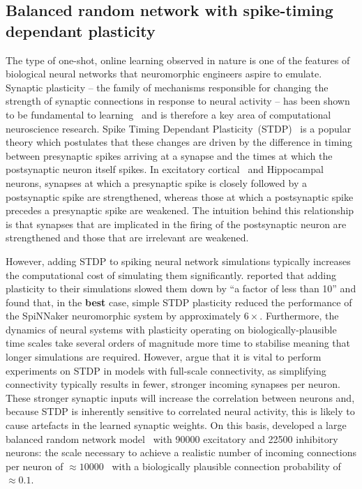 \documentclass[utf8]{frontiersSCNS} %
\begin{document}
\subsection{Balanced random network with spike-timing dependant plasticity}
\label{sec:method/balanced_random}
The type of one-shot, online learning observed in nature is one of the features of biological neural networks that neuromorphic engineers aspire to emulate.
Synaptic plasticity -- the family of mechanisms responsible for changing the strength of synaptic connections in response to neural activity -- has been shown to be fundamental to learning~\citep{Nabavi2014} and is therefore a key area of computational neuroscience research.
Spike Timing Dependant Plasticity~(STDP)~\citep{Markram1997,Bi1998} is a popular theory which postulates that these changes are driven by the difference in timing between presynaptic spikes arriving at a synapse and the times at which the postsynaptic neuron itself spikes.
In excitatory cortical~\citep{Markram1997} and Hippocampal~\citep{Bi1998} neurons, synapses at which a presynaptic spike is closely followed by a postsynaptic spike are strengthened, whereas those at which a postsynaptic spike precedes a presynaptic spike are weakened.
The intuition behind this relationship is that synapses that are implicated in the firing of the postsynaptic neuron are strengthened and those that are irrelevant are weakened.

However, adding STDP to spiking neural network simulations typically increases the computational cost of simulating them significantly. 
\citet{Morrison2007} reported that adding plasticity to their simulations slowed them down by ``a factor of less than 10'' and \citet{Knight2016b} found that, in the \textbf{best} case, simple STDP plasticity reduced the performance of the SpiNNaker neuromorphic system by approximately $6\times$.
Furthermore, the dynamics of neural systems with plasticity operating on biologically-plausible time scales take several orders of magnitude more time to stabilise meaning that longer simulations are required.
However, \citeauthor{Morrison2007} argue that it is vital to perform experiments on STDP in models with full-scale connectivity, as simplifying connectivity typically results in fewer, stronger incoming synapses per neuron.
These stronger synaptic inputs will increase the correlation between neurons and, because STDP is inherently sensitive to correlated neural activity, this is likely to cause artefacts in the learned synaptic weights.
On this basis, \citeauthor{Morrison2007} developed a large balanced random network model~\citep{Brunel2000} with \num{90000} excitatory and \num{22500} inhibitory neurons: the scale necessary to achieve a realistic number of incoming connections per neuron of $\approx 10000$~\citep{braitenberg2013cortex} with a biologically plausible connection probability of $\approx 0.1$.
\end{document}
